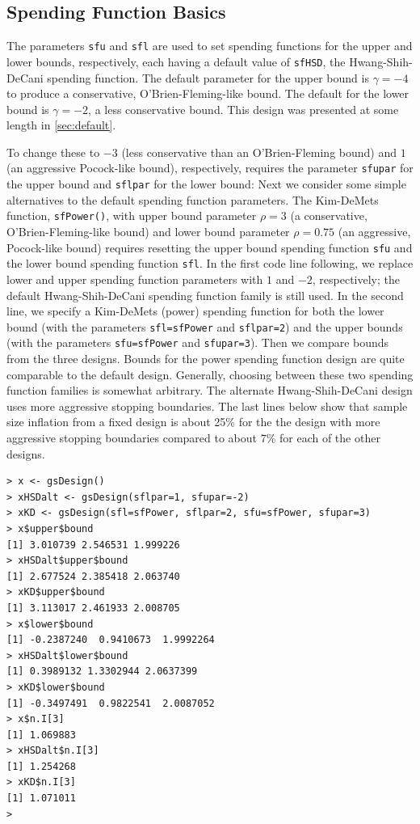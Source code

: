 \subsection{Spending Function Basics}

The parameters \texttt{sfu} and \texttt{sfl} are used to set spending functions for the upper and lower bounds, respectively, each having a default value of \texttt{sfHSD}, the Hwang-Shih-DeCani spending function.
The default parameter for the upper bound is $\gamma = -4$ to produce a conservative, O'Brien-Fleming-like bound. 
The default for the lower bound is $\gamma = -2$, a less conservative bound. 
This design was presented at some length in \ref{sec:default}.

To change these to $-3$ (less conservative than an O'Brien-Fleming bound) and $1$ (an aggressive Pocock-like bound), respectively, requires the parameter \texttt{sfupar} for the upper bound and \texttt{sflpar} for the lower bound:
Next we consider some simple alternatives to the default spending function parameters.
The Kim-DeMets function, \texttt{sfPower()}, with upper bound parameter $\rho
= 3$ (a conservative, O'Brien-Fleming-like bound) and lower bound parameter
$\rho = 0.75$ (an aggressive, Pocock-like bound) requires resetting the upper bound spending function \texttt{sfu} and the lower bound spending function \texttt{sfl}.
In the first code line following, we replace lower and upper spending function parameters with $1$ and $-2$, respectively; the default Hwang-Shih-DeCani spending function family is still used. 
In the second line, we specify a Kim-DeMets (power) spending function for
both the lower bound (with the parameters \texttt{sfl=sfPower} and \texttt{sflpar=2}) and the upper bounds (with the parameters \texttt{sfu=sfPower} and \texttt{sfupar=3}).
Then we compare bounds from the three designs. 
Bounds for the power spending function design are quite comparable to the default design. Generally, choosing between these two spending function families is somewhat arbitrary. The alternate Hwang-Shih-DeCani design uses more aggressive stopping boundaries. The last lines below show that sample size inflation from a fixed design is about 25\% for the the design with more aggressive stopping boundaries compared to about 7\% for each of the other designs. 

\bigskip

\begin{verbatim}
> x <- gsDesign()
> xHSDalt <- gsDesign(sflpar=1, sfupar=-2)
> xKD <- gsDesign(sfl=sfPower, sflpar=2, sfu=sfPower, sfupar=3)
> x$upper$bound
[1] 3.010739 2.546531 1.999226
> xHSDalt$upper$bound
[1] 2.677524 2.385418 2.063740
> xKD$upper$bound
[1] 3.113017 2.461933 2.008705
> x$lower$bound
[1] -0.2387240  0.9410673  1.9992264
> xHSDalt$lower$bound
[1] 0.3989132 1.3302944 2.0637399
> xKD$lower$bound
[1] -0.3497491  0.9822541  2.0087052
> x$n.I[3]
[1] 1.069883
> xHSDalt$n.I[3]
[1] 1.254268
> xKD$n.I[3]
[1] 1.071011
>\end{verbatim}

